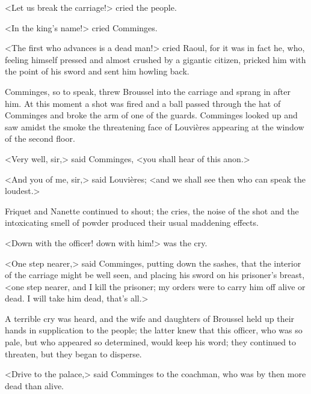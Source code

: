 <Let us break the carriage!> cried the people.

<In the king's name!> cried Comminges.

<The first who advances is a dead man!> cried Raoul, for it was in fact he, who, feeling himself pressed and almost crushed by a gigantic citizen, pricked him with the point of his sword and sent him howling back.

Comminges, so to speak, threw Broussel into the carriage and sprang in after him. At this moment a shot was fired and a ball passed through the hat of Comminges and broke the arm of one of the guards. Comminges looked up and saw amidst the smoke the threatening face of Louvières appearing at the window of the second floor.

<Very well, sir,> said Comminges, <you shall hear of this anon.>

<And you of me, sir,> said Louvières; <and we shall see then who can speak the loudest.>

Friquet and Nanette continued to shout; the cries, the noise of the shot and the intoxicating smell of powder produced their usual maddening effects.

<Down with the officer! down with him!> was the cry.

<One step nearer,> said Comminges, putting down the sashes, that the interior of the carriage might be well seen, and placing his sword on his prisoner's breast, <one step nearer, and I kill the prisoner; my orders were to carry him off alive or dead. I will take him dead, that's all.>

A terrible cry was heard, and the wife and daughters of Broussel held up their hands in supplication to the people; the latter knew that this officer, who was so pale, but who appeared so determined, would keep his word; they continued to threaten, but they began to disperse.

<Drive to the palace,> said Comminges to the coachman, who was by then more dead than alive.

